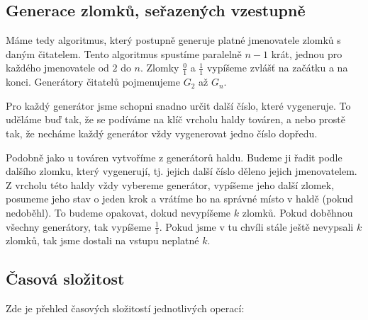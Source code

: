 \documentclass{article}
\begin{document}
\subsection{Generace zlomků, seřazených vzestupně}

Máme tedy algoritmus, který postupně generuje platné jmenovatele zlomků s daným čitatelem. Tento algoritmus spustíme paralelně $n-1$ krát, jednou pro každého jmenovatele od $2$ do $n$. Zlomky $\frac{0}{1}$ a $\frac{1}{1}$ vypíšeme zvlášť na začátku a na konci. Generátory čitatelů pojmenujeme $G_2$ až $G_n$.

Pro každý generátor jsme schopni snadno určit další číslo, které vygeneruje. To uděláme buď tak, že se podíváme na klíč vrcholu haldy továren, a nebo prostě tak, že necháme každý generátor vždy vygenerovat jedno číslo dopředu.

Podobně jako u továren vytvoříme z generátorů haldu. Budeme ji řadit podle dalšího zlomku, který vygenerují, tj. jejich další číslo děleno jejich jmenovatelem. Z vrcholu této haldy vždy vybereme generátor, vypíšeme jeho další zlomek, posuneme jeho stav o jeden krok a vrátíme ho na správné místo v haldě (pokud nedoběhl). To budeme opakovat, dokud nevypíšeme $k$ zlomků. Pokud doběhnou všechny generátory, tak vypíšeme $\frac{1}{1}$. Pokud jsme v tu chvíli stále ještě nevypsali $k$ zlomků, tak jsme dostali na vstupu neplatné $k$.

\subsection{Časová složitost}

Zde je přehled časových složitostí jednotlivých operací:
\end{document}
